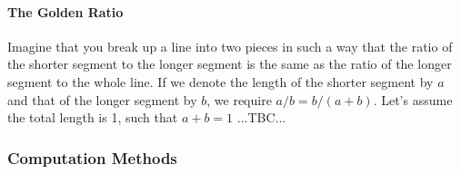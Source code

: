 




 
\paragraph{The Golden Ratio}
Imagine that you break up a line into two pieces in such a way that the ratio of the shorter segment to the longer segment is the same as the ratio of the longer segment to the whole line. If we denote the length of the shorter segment by $a$ and that of the longer segment by $b$, we require $a/b = b/(a+b)$. Let's assume the total length is 1, such that $a+b=1$ ...TBC...










\subsubsection{Computation Methods}


